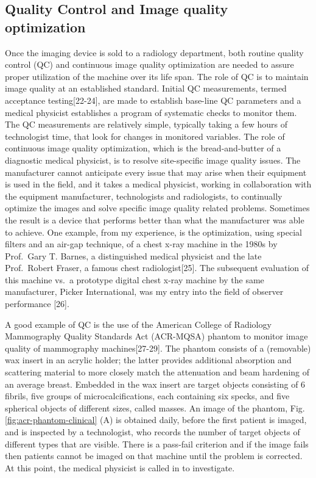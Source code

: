 \documentclass[
]{book}
\begin{document}
\hypertarget{quality-control-and-image-quality-optimization}{%
\subsection{Quality Control and Image quality optimization}\label{quality-control-and-image-quality-optimization}}

Once the imaging device is sold to a radiology department, both routine quality control (QC) and continuous image quality optimization are needed to assure proper utilization of the machine over its life span. The role of QC is to maintain image quality at an established standard. Initial QC measurements, termed acceptance testing{[}22-24{]}, are made to establish base-line QC parameters and a medical physicist establishes a program of systematic checks to monitor them. The QC measurements are relatively simple, typically taking a few hours of technologist time, that look for changes in monitored variables. The role of continuous image quality optimization, which is the bread-and-butter of a diagnostic medical physicist, is to resolve site-specific image quality issues. The manufacturer cannot anticipate every issue that may arise when their equipment is used in the field, and it takes a medical physicist, working in collaboration with the equipment manufacturer, technologists and radiologists, to continually optimize the images and solve specific image quality related problems. Sometimes the result is a device that performs better than what the manufacturer was able to achieve. One example, from my experience, is the optimization, using special filters and an air-gap technique, of a chest x-ray machine in the 1980s by Prof.~Gary T. Barnes, a distinguished medical physicist and the late Prof.~Robert Fraser, a famous chest radiologist{[}25{]}. The subsequent evaluation of this machine vs.~a prototype digital chest x-ray machine by the same manufacturer, Picker International, was my entry into the field of observer performance {[}26{]}.

A good example of QC is the use of the American College of Radiology Mammography Quality Standards Act (ACR-MQSA) phantom to monitor image quality of mammography machines{[}27-29{]}. The phantom consists of a (removable) wax insert in an acrylic holder; the latter provides additional absorption and scattering material to more closely match the attenuation and beam hardening of an average breast. Embedded in the wax insert are target objects consisting of 6 fibrils, five groups of microcalcifications, each containing six specks, and five spherical objects of different sizes, called masses. An image of the phantom, Fig. \ref{fig:acr-phantom-clinical} (A) is obtained daily, before the first patient is imaged, and is inspected by a technologist, who records the number of target objects of different types that are visible. There is a pass-fail criterion and if the image fails then patients cannot be imaged on that machine until the problem is corrected. At this point, the medical physicist is called in to investigate.
\end{document}
